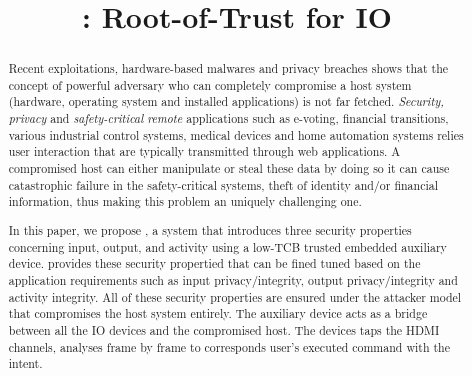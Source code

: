 

\newif\ifpaper
\papertrue


\newif\ifdesperatetime

\graphicspath{{images/}}


\title{\name: Root-of-Trust for IO}

\maketitle

\begin{abstract}
 
Recent exploitations, hardware-based malwares and privacy breaches shows that the concept of powerful adversary who can completely compromise a host system (hardware, operating system and installed applications) is not far fetched. \emph{Security, privacy} and \emph{safety-critical} \emph{remote} applications such as e-voting, financial transitions, various industrial control systems, medical devices and home automation systems relies user interaction that are typically transmitted through web applications. A compromised host can either manipulate or steal these data by doing so it can cause catastrophic failure in the safety-critical systems, theft of identity and/or financial information, thus making this problem an uniquely challenging one.

In this paper, we propose \name, a system that introduces three security properties concerning input, output, and activity using a low-TCB trusted embedded auxiliary device. \name provides these security propertied that can be fined tuned based on the application requirements such as input privacy/integrity, output privacy/integrity and activity integrity. All of these security properties are ensured under the attacker model that compromises the host system entirely. The auxiliary device acts as a bridge between all the IO devices and the compromised host. The devices taps the HDMI channels, analyses frame by frame to corresponds user's executed command with the intent. 
\end{abstract}










%




